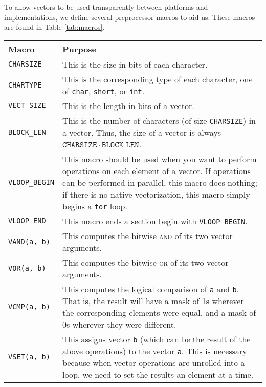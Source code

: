 \documentclass{article}
\begin{document}
To allow vectors to be used transparently between platforms and implementations,
we define several preprocessor macros to aid us.  These macros are found in
Table \ref{tab:macros}.
\begin{table}
  \centering
  \begin{tabular}{lp{250pt}}
    \hline
    Macro & Purpose \\
    \hline
    \texttt{CHARSIZE} & This is the size in bits of each character.\\
    
    \texttt{CHARTYPE} & This is the corresponding type of each character, one of
    \texttt{char}, \texttt{short}, or \texttt{int}.\\
    
    \texttt{VECT\_SIZE} & This is the length in bits of a vector. \\
    
    \texttt{BLOCK\_LEN} & This is the number of characters (of size
    \texttt{CHARSIZE}) in a vector.  Thus, the size of a vector is always
    $\mathtt{CHARSIZE}\cdot\mathtt{BLOCK\_LEN}$. \\

    \texttt{VLOOP\_BEGIN} & This macro should be used when you want to perform
    operations on each element of a vector.  If operations can be performed in
    parallel, this macro does nothing;  if there is no native vectorization,
    this macro simply begins a \texttt{for} loop. \\

    \texttt{VLOOP\_END} & This macro ends a section begin with
    \texttt{VLOOP\_BEGIN}. \\

    \texttt{VAND(a, b)} & This computes the bitwise \textsc{and} of its two
    vector arguments. \\

    \texttt{VOR(a, b)} & This computes the bitwise \textsc{or} of its two vector
    arguments. \\

    \texttt{VCMP(a, b)} & This computes the logical comparison of \texttt{a} and
    \texttt{b}.  That is, the result will have a mask of 1s wherever the
    corresponding elements were equal, and a mask of 0s wherever they were
    different. \\

    \texttt{VSET(a, b)} & This assigns vector \texttt{b} (which can be the
    result of the above operations) to the vector \texttt{a}.  This is necessary
    because when vector operations are unrolled into a loop, we need to set the
    results an element at a time. \\


\end{tabular}
\end{table}
\end{document}
